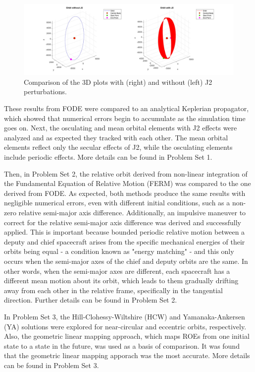 \begin{figure}[H]
    \centering
    \includegraphics[width=1.1\linewidth]{PS1/Figures/Orbit_J2_Comparison_ECI.jpg}
    \caption{Comparison of the 3D plots with (right) and without (left) J2 perturbations. }
    \label{fig:3d_plots_with_j2}
\end{figure}

These results from FODE were compared to an analytical Keplerian propagator, which showed that numerical errors begin to accumulate as the simulation time goes on. Next, the osculating and mean orbital elements with J2 effects were analyzed and as expected they tracked with each other. The mean orbital elements reflect only the secular effects of J2, while the osculating elements include periodic effects. More details can be found in Problem Set 1.

Then, in Problem Set 2, the relative orbit derived from non-linear integration of the Fundamental Equation of Relative Motion (FERM) was compared to the one derived from FODE. As expected, both methods produce the same results with negligible numerical errors, even with different initial conditions, such as a non-zero relative semi-major axis difference. Additionally, an impulsive maneuver to correct for the relative semi-major axis difference was derived and successfully applied. This is important because bounded periodic relative motion between a deputy and chief spacecraft arises from the specific mechanical energies of their orbits being equal - a condition known as "energy matching" - and this only occurs when the semi-major axes of the chief and deputy orbits are the same. In other words, when the semi-major axes are different, each spacecraft has a different mean motion about its orbit, which leads to them gradually drifting away from each other in the relative frame, specifically in the tangential direction. Further details can be found in Problem Set 2. 

In Problem Set 3, the Hill-Clohessy-Wiltshire (HCW) and Yamanaka-Ankersen (YA) solutions were explored for near-circular and eccentric orbits, respectively. Also, the geometric linear mapping approach, which maps ROEs from one initial state to a state in the future, was used as a basis of comparison. It was found that the geometric linear mapping apporach was the most accurate. More details can be found in Problem Set 3.

